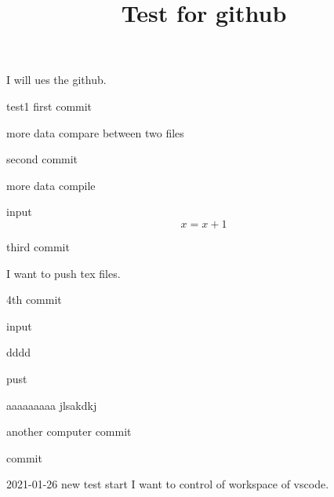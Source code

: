 \documentclass[draft]{amsart}
\title{Test for github}
\theoremstyle{remark}
\begin{document}
\maketitle
I will ues the github.

test1
first commit

more data
compare between two files

second commit

more data
compile

input
\begin{equation*}
    x= x+1
\end{equation*}



third commit

I want to push tex files.


4th commit

input


dddd


pust

aaaaaaaaa
jlsakdkj

another computer
commit


commit

2021-01-26 new test start
I want to control of workspace of vscode.
\end{document}
